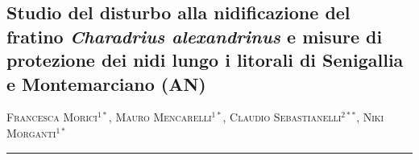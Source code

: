 \setcounter{figure}{0}
\setcounter{table}{0}

\begin{adjustwidth}{-3.5cm}{-1cm}
\pagestyle{CIOpage}
\chapter*[Disturbo alla nidificazione del fratino e misure di protezione]{Studio del disturbo alla nidificazione del fratino \textbf{\textit{Charadrius alexandrinus}} e misure di
protezione dei nidi lungo i litorali di Senigallia e Montemarciano (AN)
}
 
\end{adjustwidth}
\begin{adjustwidth}{-3.5cm}{0cm}
\textsc{Francesca Morici}$^{1*}$, \textsc{Mauro Mencarelli}$^{1*}$,
\textsc{Claudio Sebastianelli}$^{2**}$, \textsc{Niki Morganti}$^{1*}$  \\

   
\noindent\color{MUSEBLUE}\rule{27cm}{2pt}
\vspace{1cm}
\end{adjustwidth}


